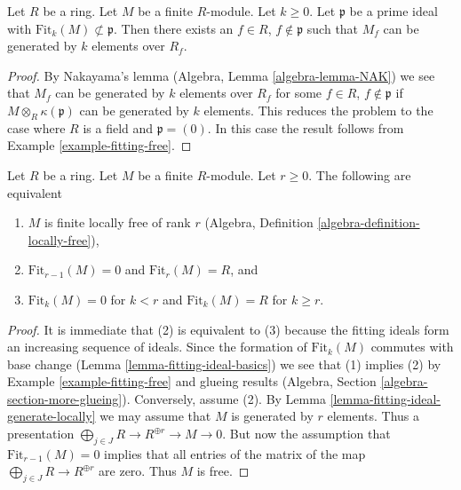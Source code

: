 \begin{lemma}
\label{lemma-fitting-ideal-generate-locally}
Let $R$ be a ring. Let $M$ be a finite $R$-module. Let $k \geq 0$.
Let $\mathfrak p$ be a prime ideal with
$\text{Fit}_k(M) \not \subset \mathfrak p$. Then there exists
an $f \in R$, $f \not \in \mathfrak p$ such that $M_f$ can be
generated by $k$ elements over $R_f$.
\end{lemma}

\begin{proof}
By Nakayama's lemma (Algebra, Lemma \ref{algebra-lemma-NAK}) we see that
$M_f$ can be generated by $k$ elements over $R_f$ for some
$f \in R$, $f \not \in \mathfrak p$ if $M \otimes_R \kappa(\mathfrak p)$
can be generated by $k$ elements. This reduces the problem to the
case where $R$ is a field and $\mathfrak p = (0)$. In this case
the result follows from Example \ref{example-fitting-free}.
\end{proof}

\begin{lemma}
\label{lemma-fitting-ideal-finite-locally-free}
Let $R$ be a ring. Let $M$ be a finite $R$-module. Let $r \geq 0$.
The following are equivalent
\begin{enumerate}
\item $M$ is finite locally free of rank $r$
(Algebra, Definition \ref{algebra-definition-locally-free}),
\item $\text{Fit}_{r - 1}(M) = 0$ and $\text{Fit}_r(M) = R$, and
\item $\text{Fit}_k(M) = 0$ for $k < r$ and $\text{Fit}_k(M) = R$
for $k \geq r$.
\end{enumerate}
\end{lemma}

\begin{proof}
It is immediate that (2) is equivalent to (3) because the fitting ideals
form an increasing sequence of ideals.
Since the formation of $\text{Fit}_k(M)$ commutes with base change
(Lemma \ref{lemma-fitting-ideal-basics}) we see that (1) implies (2) by
Example \ref{example-fitting-free}
and glueing results (Algebra, Section \ref{algebra-section-more-glueing}).
Conversely, assume (2). By
Lemma \ref{lemma-fitting-ideal-generate-locally} we may assume that $M$
is generated by $r$ elements. Thus a presentation
$\bigoplus_{j \in J} R \to R^{\oplus r} \to M \to 0$.
But now the assumption that $\text{Fit}_{r - 1}(M) = 0$ implies
that all entries of the matrix of the map
$\bigoplus_{j \in J} R \to R^{\oplus r}$ are zero.
Thus $M$ is free.
\end{proof}

